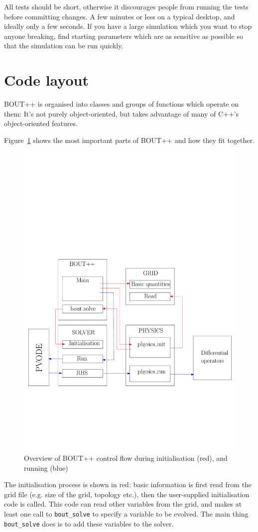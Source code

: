\documentclass[12pt]{article}
\newcommand{\code}[1]{\texttt{#1}}
\begin{document}
All tests should be short, otherwise it discourages people from running the tests before committing changes. A few minutes or less on a typical desktop, and ideally only a few seconds. If you have a large simulation which you want
to stop anyone breaking, find starting parameters which are as sensitive as possible so that the simulation
can be run quickly. 

\section{Code layout}

BOUT++ is organised into classes and groups of functions which operate on them: 
It's not purely object-oriented, but takes advantage of many of C++'s object-oriented features. 

Figure~\ref{fig:layout1} shows the most important parts of BOUT++ and how they fit together.
\begin{figure}[htbp!]
\centering
\includegraphics[width=0.7\paperwidth, keepaspectratio]{figs/layout1.pdf}
\caption{Overview of BOUT++ control flow during initialisation (red), and running (blue)}
\label{fig:layout1}
\end{figure}
The initialisation process is shown in red: basic information is first read from the grid
file (e.g. size of the grid, topology etc.), then the user-supplied initialisation
code is called. This code can read other variables from the grid, and makes at least
one call
to \code{bout\_solve} to specify a variable to be evolved. The main thing \code{bout\_solve}
does is to add these variables to the solver. 
\end{document}
